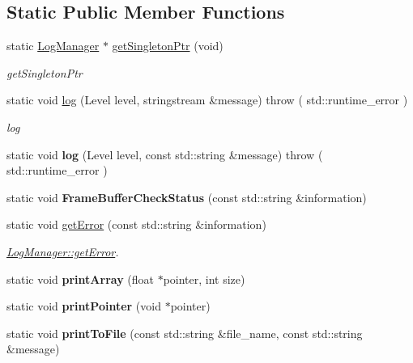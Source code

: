 \subsection*{Static Public Member Functions}
\begin{DoxyCompactItemize}
\item 
static \hyperlink{classEngine_1_1LogManager}{Log\+Manager} $\ast$ \hyperlink{classEngine_1_1LogManager_a5ab655fd02bb6c0ae2cde3be4794375f}{get\+Singleton\+Ptr} (void)
\begin{DoxyCompactList}\small\item\em get\+Singleton\+Ptr \end{DoxyCompactList}\item 
static void \hyperlink{classEngine_1_1LogManager_acdc0eb4baacb4f3b018698665d398c6a}{log} (Level level, stringstream \&message)  throw ( std\+::runtime\+\_\+error )
\begin{DoxyCompactList}\small\item\em log \end{DoxyCompactList}\item 
\hypertarget{classEngine_1_1LogManager_ab3977fc0bd8b1df870e96588b082afa8}{}static void {\bfseries log} (Level level, const std\+::string \&message)  throw ( std\+::runtime\+\_\+error )\label{classEngine_1_1LogManager_ab3977fc0bd8b1df870e96588b082afa8}

\item 
\hypertarget{classEngine_1_1LogManager_a17b9d4159c82a218d4db38430490d492}{}static void {\bfseries Frame\+Buffer\+Check\+Status} (const std\+::string \&information)\label{classEngine_1_1LogManager_a17b9d4159c82a218d4db38430490d492}

\item 
static void \hyperlink{classEngine_1_1LogManager_a00096d95e37109861617033fd26a9e91}{get\+Error} (const std\+::string \&information)
\begin{DoxyCompactList}\small\item\em \hyperlink{classEngine_1_1LogManager_a00096d95e37109861617033fd26a9e91}{Log\+Manager\+::get\+Error}. \end{DoxyCompactList}\item 
\hypertarget{classEngine_1_1LogManager_a2c386f3ab894bbd5c1c337197fcfb6d9}{}static void {\bfseries print\+Array} (float $\ast$pointer, int size)\label{classEngine_1_1LogManager_a2c386f3ab894bbd5c1c337197fcfb6d9}

\item 
\hypertarget{classEngine_1_1LogManager_a0f64948d2f9f79627fbbfcfeb1e1527f}{}static void {\bfseries print\+Pointer} (void $\ast$pointer)\label{classEngine_1_1LogManager_a0f64948d2f9f79627fbbfcfeb1e1527f}

\item 
\hypertarget{classEngine_1_1LogManager_ae1d7f155f7c9a06330e8d4f712333a95}{}static void {\bfseries print\+To\+File} (const std\+::string \&file\+\_\+name, const std\+::string \&message)\label{classEngine_1_1LogManager_ae1d7f155f7c9a06330e8d4f712333a95}

\end{DoxyCompactItemize}


